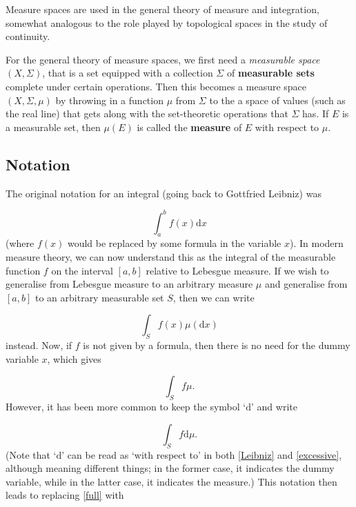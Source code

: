 \documentclass[preprint, 5p, 10pt]{elsarticle}
\theoremstyle{plain}
\begin{document}
Measure spaces are used in the general theory of measure and integration, somewhat analogous to the role played by topological spaces in the study of continuity.

For the general theory of measure spaces, we first need a \emph{measurable space} $(X, \Sigma)$, that is a set equipped with a collection $\Sigma$ of \textbf{measurable sets} complete under certain operations. Then this becomes a measure space $(X, \Sigma, \mu)$ by throwing in a function $\mu$ from $\Sigma$ to the a space of values (such as the real line) that gets along with the set-theoretic operations that $\Sigma$ has. If $E$ is a measurable set, then $\mu(E)$ is called the \textbf{measure} of $E$ with respect to $\mu$.

\hypertarget{notation_5}{}\subsection*{{Notation}}\label{notation_5}

The original notation for an integral (going back to Gottfried Leibniz) was

\begin{equation}
\int_a^b f(x) \mathrm{d}x
\label{Leibniz}\end{equation}
(where $f(x)$ would be replaced by some formula in the variable $x$). In modern measure theory, we can now understand this as the integral of the measurable function $f$ on the interval $[a,b]$ relative to Lebesgue measure. If we wish to generalise from Lebesgue measure to an arbitrary measure $\mu$ and generalise from $[a,b]$ to an arbitrary measurable set $S$, then we can write

\begin{equation}
\int_S f(x) \mu(\mathrm{d}x)
\label{full}\end{equation}
instead. Now, if $f$ is not given by a formula, then there is no need for the dummy variable $x$, which gives

\begin{equation}
\int_S f \mu .
\label{simple}\end{equation}
However, it has been more common to keep the symbol ‘$\mathrm{d}$’ and write

\begin{equation}
\int_S f \mathrm{d}\mu .
\label{excessive}\end{equation}
(Note that ‘$\mathrm{d}$’ can be read as `{}with respect to'{} in both \eqref{Leibniz} and \eqref{excessive}, although meaning different things; in the former case, it indicates the dummy variable, while in the latter case, it indicates the measure.) This notation then leads to replacing \eqref{full} with
\end{document}
